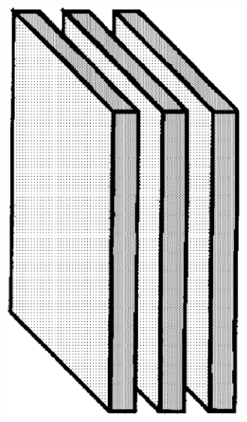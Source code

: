 \documentclass[../main.tex]{subfiles}
\begin{document}
\begin{figure}[tb]
    \centering
    \begin{subfigure}[b]{0.15\textwidth}
        \includegraphics[width=\textwidth]{figures/einleitung/phase1}
    \end{subfigure}
    \begin{subfigure}[b]{0.15\textwidth}

\end{subfigure}
\end{figure}
\end{document}
